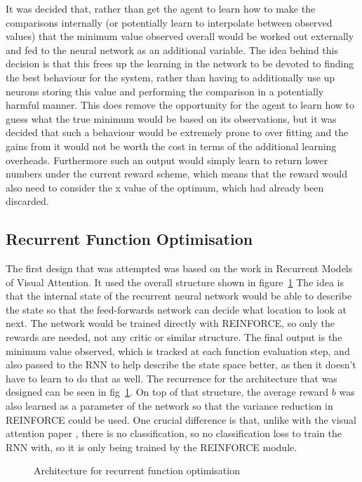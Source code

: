 It was decided that, rather than get the agent to learn how to make the comparisons internally (or potentially learn to interpolate between observed values) that the minimum value observed overall would be worked out externally and fed to the neural network as an additional variable. The idea behind this decision is that this frees up the learning in the network to be devoted to finding the best behaviour for the system, rather than having to additionally use up neurons storing this value and performing the comparison in a potentially harmful manner. This does remove the opportunity for the agent to learn how to guess what the true minimum would be based on its observations, but it was decided that such a behaviour would be extremely prone to over fitting and the gains from it would not be worth the cost in terms of the additional learning overheads. Furthermore such an output would simply learn to return lower numbers under the current reward scheme, which means that the reward would also need to consider the x value of the optimum, which had already been discarded.

\subsection{Recurrent Function Optimisation}
The first design that was attempted was based on the work in Recurrent Models of Visual Attention\cite{RVA}. It used the overall structure shown in figure~\ref{fig:RFOarch} The idea is that the internal state of the recurrent neural network would be able to describe the state so that the feed-forwards network can decide what location to look at next. The network would be trained directly with REINFORCE, so only the rewards are needed, not any critic or similar structure. The final output is the minimum value observed, which is tracked at each function evaluation step, and also passed to the RNN to help describe the state space better, as then it doesn't have to learn to do that as well. The recurrence for the architecture that was designed can be seen in fig~\ref{fig:RFOarch}. On top of that structure, the average reward $b$ was also learned as a parameter of the network so that the variance reduction in REINFORCE could be used. One crucial difference is that, unlike with the visual attention paper \cite{RVA}, there is no classification, so no classification loss to train the RNN with, so it is only being trained by the REINFORCE module.

\begin{figure}
\centering

\caption{Architecture for recurrent function optimisation}
\label{fig:RFOarch}
\end{figure}

